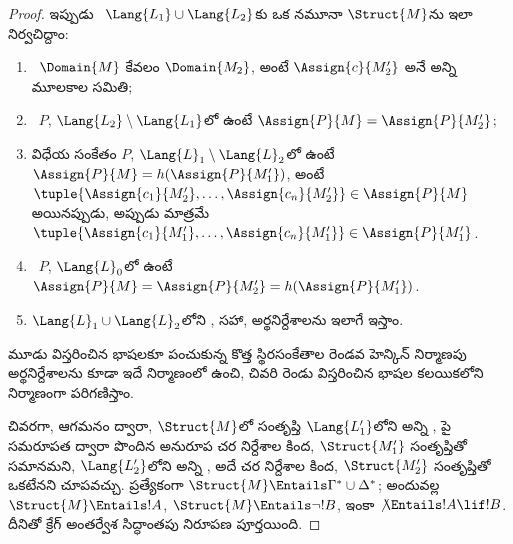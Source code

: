 \documentclass[../../../include/open-logic-section]{subfiles}
\begin{document}
\begin{proof}
ఇప్పుడు ~$\Lang{L_1} \cup \Lang{L_2}$కు
ఒక నమూనా $\Struct{M}$ను ఇలా నిర్వచిద్దాం:
\begin{enumerate}
\item {}~$\Domain{M}$ కేవలం
  $\Domain{M_2}$, అంటే $\Assign{c}{M'_2}$ అనే అన్ని మూలకాల సమితి;
\item {}~$P$,
  $\Lang{L_2} \setminus \Lang{L_1}$లో ఉంటే
  $\Assign{P}{M} = \Assign{P}{M'_2}$;
\item విధేయ సంకేతం $P$, $\Lang{L}_1\setminus \Lang{L}_2$లో ఉంటే
  $\Assign{P}{M} = h(\Assign{P}{M'_1})$, అంటే
  $\tuple{\Assign{c_1}{M'_2}, \dots, \Assign{c_n}{M'_2}} \in
  \Assign{P}{M}$ అయినప్పుడు, అప్పుడు మాత్రమే
  $\tuple{\Assign{c_1}{M'_1}, \dots, \Assign{c_n}{M'_1}} \in
  \Assign{P}{M'_1}$.
\item {}~$P$,
  $\Lang{L}_0$లో ఉంటే $\Assign{P}{M} = \Assign{P}{M'_2} =
  h(\Assign{P}{M'_1})$.
\item $\Lang{L}_1 \cup \Lang{L}_2$లోని
  ,
   సహా, అర్థనిర్దేశాలను ఇలాగే ఇస్తాం.
\end{enumerate}
మూడు విస్తరించిన భాషలకూ పంచుకున్న కొత్త స్థిరసంకేతాల రెండవ హెన్కిన్
నిర్మాణపు అర్థనిర్దేశాలను కూడా ఇదే నిర్మాణంలో ఉంచి, చివరి రెండు
విస్తరించిన భాషల కలయికలోని నిర్మాణంగా పరిగణిస్తాం.

చివరగా,  ఆగమనం ద్వారా,
$\Struct{M}$లో సంతృప్తి $\Lang{L'_1}$లోని అన్ని
, పై సమరూపత ద్వారా పొందిన
అనురూప చర నిర్దేశాల కింద, $\Struct{M'_1}$ సంతృప్తితో సమానమని, $\Lang{L'_2}$లోని
అన్ని , అదే చర నిర్దేశాల కింద,
$\Struct{M'_2}$ సంతృప్తితో
ఒకటేనని చూపవచ్చు.
ప్రత్యేకంగా $\Struct{M} \Entails \Gamma^* \cup \Delta^*$; అందువల్ల
$\Struct{M} \Entails !A$, $\Struct{M} \Entails \lnot!B$, ఇంకా
$\not\Entails !A \lif !B$. దీనితో క్రేగ్ అంతర్వేశ సిద్ధాంతపు
నిరూపణ పూర్తయింది.
\end{proof}
\end{document}
